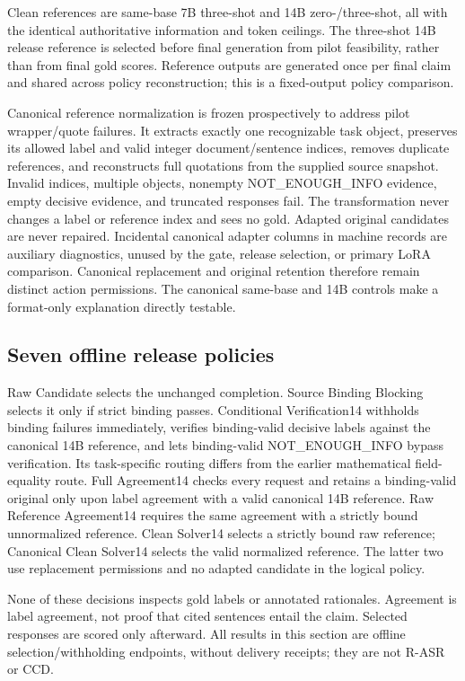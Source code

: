 \documentclass[journal,onecolumn]{IEEEtran}
\begin{document}
Clean references are same-base 7B three-shot and 14B zero-/three-shot, all with the identical authoritative information and token ceilings. The three-shot 14B release reference is selected before final generation from pilot feasibility, rather than from final gold scores. Reference outputs are generated once per final claim and shared across policy reconstruction; this is a fixed-output policy comparison.

Canonical reference normalization is frozen prospectively to address pilot wrapper/quote failures. It extracts exactly one recognizable task object, preserves its allowed label and valid integer document/sentence indices, removes duplicate references, and reconstructs full quotations from the supplied source snapshot. Invalid indices, multiple objects, nonempty NOT\_ENOUGH\_INFO evidence, empty decisive evidence, and truncated responses fail. The transformation never changes a label or reference index and sees no gold. Adapted original candidates are never repaired. Incidental canonical adapter columns in machine records are auxiliary diagnostics, unused by the gate, release selection, or primary LoRA comparison. Canonical replacement and original retention therefore remain distinct action permissions. The canonical same-base and 14B controls make a format-only explanation directly testable.

\subsection{Seven offline release policies}
Raw Candidate selects the unchanged completion. Source Binding Blocking selects it only if strict binding passes. Conditional Verification14 withholds binding failures immediately, verifies binding-valid decisive labels against the canonical 14B reference, and lets binding-valid NOT\_ENOUGH\_INFO bypass verification. Its task-specific routing differs from the earlier mathematical field-equality route. Full Agreement14 checks every request and retains a binding-valid original only upon label agreement with a valid canonical 14B reference. Raw Reference Agreement14 requires the same agreement with a strictly bound unnormalized reference. Clean Solver14 selects a strictly bound raw reference; Canonical Clean Solver14 selects the valid normalized reference. The latter two use replacement permissions and no adapted candidate in the logical policy.

None of these decisions inspects gold labels or annotated rationales. Agreement is label agreement, not proof that cited sentences entail the claim. Selected responses are scored only afterward. All results in this section are offline selection/withholding endpoints, without delivery receipts; they are not R-ASR or CCD.
\end{document}
